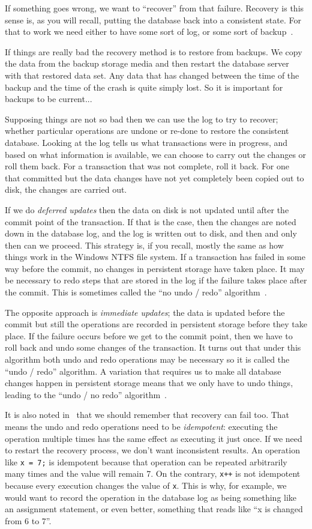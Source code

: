 If something goes wrong, we want to ``recover'' from that failure. Recovery is this sense is, as you will recall, putting the database back into a consistent state. For that to work we need either to have some sort of log, or some sort of backup~\cite{fds}.

If things are really bad the recovery method is to restore from backups. We copy the data from the backup storage media and then restart the database server with that restored data set. Any data that has changed between the time of the backup and the time of the crash is quite simply lost. So it is important for backups to be current...

Supposing things are not so bad then we can use the log to try to recover; whether particular operations are undone or re-done to restore the consistent database. Looking at the log tells us what transactions were in progress, and based on what information is available, we can choose to carry out the changes or roll them back. For a transaction that was not complete, roll it back. For one that committed but the data changes have not yet completely been copied out to disk,  the changes are carried out.

If we do \textit{deferred updates} then the data on disk is not updated until after the commit point of the transaction. If that is the case, then the changes are noted down in the database log, and the log is written out to disk, and then and only then can we proceed. This strategy is, if you recall, mostly the same as how things work in the Windows NTFS file system. If a transaction has failed in some way before the commit, no changes in persistent storage have taken place. It may be necessary to redo steps that are stored in the log if the failure takes place after the commit. This is sometimes called the ``no undo / redo'' algorithm~\cite{fds}.

The opposite approach is \textit{immediate updates}; the data is updated before the commit but still the operations are recorded in persistent storage before they take place. If the failure occurs before we get to the commit point, then we have to roll back and undo some changes of the transaction. It turns out that under this algorithm both undo and redo operations may be necessary so it is called the ``undo / redo'' algorithm. A variation that requires us to make all database changes happen in persistent storage means that we only have to undo things, leading to the ``undo / no redo'' algorithm~\cite{fds}.

It is also noted in~\cite{fds} that we should remember that recovery can fail too. That means the undo and redo operations need to be \textit{idempotent}: executing the operation multiple times has the same effect as executing it just once. If we need to restart the recovery process, we don't want inconsistent results. An operation like \texttt{x = 7;} is idempotent because that operation can be repeated arbitrarily many times and the value will remain 7. On the contrary, \texttt{x++} is not idempotent because every execution changes the value of \texttt{x}. This is why, for example, we would want to record the operation in the database log as being something like an assignment statement, or even better, something that reads like ``x is changed from 6 to 7''.

